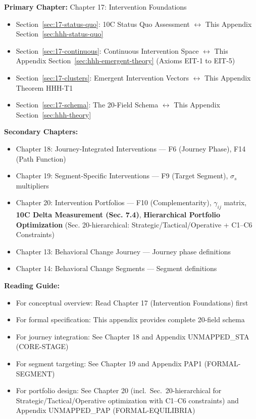 \begin{tcolorbox}[colback=purple!5!white, colframe=purple!75!black,
    title=Chapter Linkage]

\textbf{Primary Chapter:} Chapter 17: Intervention Foundations
\begin{itemize}[nosep]
\item Section~\ref{sec:17-status-quo}: 10C Status Quo Assessment $\leftrightarrow$ This Appendix Section~\ref{sec:hhh-status-quo}
\item Section~\ref{sec:17-continuous}: Continuous Intervention Space $\leftrightarrow$ This Appendix Section~\ref{sec:hhh-emergent-theory} (Axioms EIT-1 to EIT-5)
\item Section~\ref{sec:17-clusters}: Emergent Intervention Vectors $\leftrightarrow$ This Appendix Theorem HHH-T1
\item Section~\ref{sec:17-schema}: The 20-Field Schema $\leftrightarrow$ This Appendix Section~\ref{sec:hhh-theory}
\end{itemize}

\textbf{Secondary Chapters:}
\begin{itemize}[nosep]
\item Chapter 18: Journey-Integrated Interventions --- F6 (Journey Phase), F14 (Path Function)
\item Chapter 19: Segment-Specific Interventions --- F9 (Target Segment), $\sigma_s$ multipliers
\item Chapter 20: Intervention Portfolios --- F10 (Complementarity), $\gamma_{ij}$ matrix, \textbf{10C Delta Measurement (Sec. 7.4)}, \textbf{Hierarchical Portfolio Optimization} (Sec. 20-hierarchical: Strategic/Tactical/Operative + C1--C6 Constraints)
\item Chapter 13: Behavioral Change Journey --- Journey phase definitions
\item Chapter 14: Behavioral Change Segments --- Segment definitions
\end{itemize}

\textbf{Reading Guide:}
\begin{itemize}[nosep]
\item For conceptual overview: Read Chapter 17 (Intervention Foundations) first
\item For formal specification: This appendix provides complete 20-field schema
\item For journey integration: See Chapter 18 and Appendix UNMAPPED_STA (CORE-STAGE)
\item For segment targeting: See Chapter 19 and Appendix PAP1 (FORMAL-SEGMENT)
\item For portfolio design: See Chapter 20 (incl.\ Sec.\ 20-hierarchical for Strategic/Tactical/Operative optimization with C1--C6 constraints) and Appendix UNMAPPED_PAP (FORMAL-EQUILIBRIA)
\end{itemize}

\end{tcolorbox}

